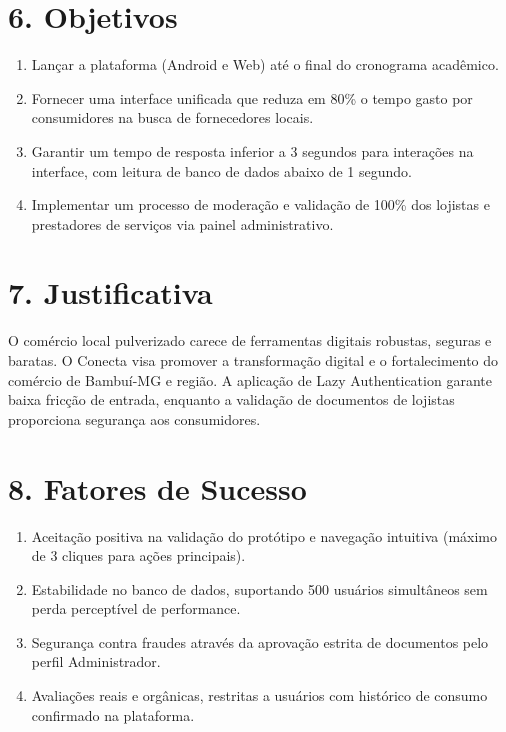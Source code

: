 \documentclass[11pt, a4paper]{article}
\begin{document}
\section*{\textcolor{headerblue}{6. Objetivos}}
\begin{enumerate}[label=\arabic*.]
    \item Lançar a plataforma (Android e Web) até o final do cronograma acadêmico.
    \item Fornecer uma interface unificada que reduza em 80\% o tempo gasto por consumidores na busca de fornecedores locais.
    \item Garantir um tempo de resposta inferior a 3 segundos para interações na interface, com leitura de banco de dados abaixo de 1 segundo.
    \item Implementar um processo de moderação e validação de 100\% dos lojistas e prestadores de serviços via painel administrativo.
\end{enumerate}

\section*{\textcolor{headerblue}{7. Justificativa}}
O comércio local pulverizado carece de ferramentas digitais robustas, seguras e baratas. O Conecta visa promover a transformação digital e o fortalecimento do comércio de Bambuí-MG e região. A aplicação de Lazy Authentication garante baixa fricção de entrada, enquanto a validação de documentos de lojistas proporciona segurança aos consumidores.

\section*{\textcolor{headerblue}{8. Fatores de Sucesso}}
\begin{enumerate}[label=\arabic*.]
    \item Aceitação positiva na validação do protótipo e navegação intuitiva (máximo de 3 cliques para ações principais).
    \item Estabilidade no banco de dados, suportando 500 usuários simultâneos sem perda perceptível de performance.
    \item Segurança contra fraudes através da aprovação estrita de documentos pelo perfil Administrador.
    \item Avaliações reais e orgânicas, restritas a usuários com histórico de consumo confirmado na plataforma.
\end{enumerate}
\end{document}
